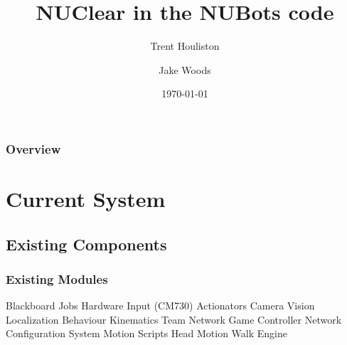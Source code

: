\documentclass{beamer}
\title[Short title]{NUClear in the NUBots code}
\author{
    Trent Houliston \and Jake Woods
}
\institute[UoN]
{
    University of Newcastle \\ %
    \medskip
    \textit{Trent.Houliston@uon.edu.au, Jake.f.woods@gmail.com} %
}
\date{\today}
\begin{document}
\begin{frame}
    \titlepage %
\end{frame}


\begin{frame}
    \frametitle{Overview}
    \tableofcontents
\end{frame}

\section{Current System}
\subsection{Existing Components}
\begin{frame}
    \frametitle{Existing Modules}
	Blackboard
	Jobs
	Hardware Input (CM730)
	Actionators
	Camera
	Vision
	Localization
	Behaviour
	Kinematics
	Team Network
	Game Controller Network
	Configuration System
	Motion
		Scripts
		Head Motion
		Walk Engine
	
\end{frame}
\end{document}
